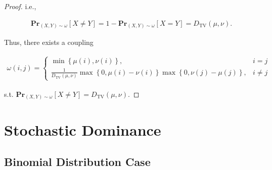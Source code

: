 \documentclass{article}
\begin{document}
\begin{proof}
\vspace{-1.2em} \hspace{3.9em}
i.e.,

\vspace{-3em}
\begin{align*}
    \mathbf{Pr}_{(X,Y)\sim\omega}\left[X\neq Y\right] = 1 - \mathbf{Pr}_{(X,Y)\sim\omega}\left[X=Y\right] = D_{\mathrm{TV}}\left(\mu,\nu\right).
\end{align*}

\vspace{2em} \hspace{1.3em}
Thus, there exists a coupling

\vspace{-1.8em}
\begin{align*}
    \omega(i,j)=\left\{
    \begin{array}{ll}
    \min\left\{\mu(i),\nu(i)\right\}, & i=j \\
    \frac{1}{D_{\mathrm{TV}}\left(\mu,\nu\right)}\max\left\{0,\mu(i)-\nu(i)\right\}\max\left\{0,\nu(j)-\mu(j)\right\}, & i\neq j
    \end{array}\right.
\end{align*}

\hspace{1.3em}
s.t. $\mathbf{Pr}_{(X,Y)\sim\omega}\left[X\neq Y\right]=D_{\mathrm{TV}}\left(\mu,\nu\right)$.
\end{proof}

\newpage


\section{Stochastic Dominance}
\vspace{1em}

\subsection{Binomial Distribution Case}
\vspace{1em}
\end{document}
